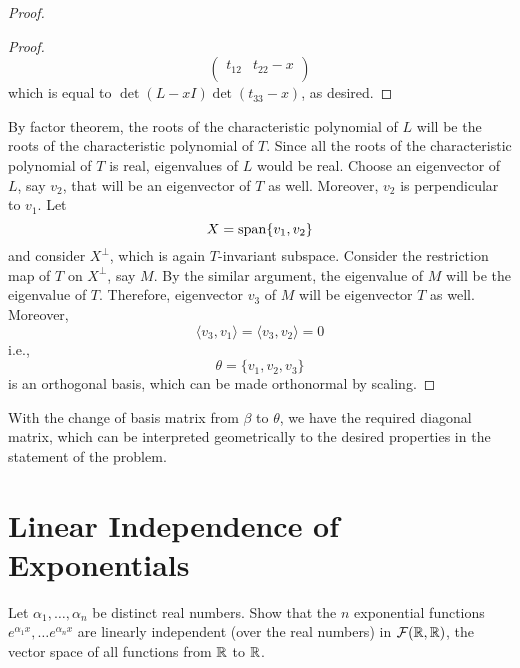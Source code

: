 \documentclass[11pt, a4paper, abstract=true]{scrartcl}
\begin{document}
\begin{soln}
\begin{proof}
\begin{proof}
\[\begin{pmatrix}
                t_{12} & t_{22} -x \\
            \end{pmatrix}
            \]
            which is equal to \(\det (L - xI) \det (t_{33} - x)\), as desired.
        \end{proof}
        By factor theorem, the roots of the characteristic polynomial of \(L\) will be the roots of the characteristic polynomial of \(T\). Since all the roots of the characteristic polynomial of \(T\) is real, eigenvalues of \(L\) would be real. Choose an eigenvector of \(L\), say \(v_2\), that will be an eigenvector of \(T\) as well. Moreover, \(v_2\) is perpendicular to \(v_1\). Let \[X = \operatorname{span}\{v_1, v_2\}\] and consider \(X^\perp\), which is again \(T\)-invariant subspace. Consider the restriction map of \(T\) on \(X^\perp\), say \(M\). By the similar argument, the eigenvalue of \(M\) will be the eigenvalue of \(T\). Therefore, eigenvector \(v_3\) of \(M\) will be eigenvector \(T\) as well. Moreover, \[\langle v_3, v_1 \rangle = \langle v_3, v_2 \rangle = 0\]
        i.e., \[\theta = \{v_1, v_2, v_3\}\] is an orthogonal basis, which can be made orthonormal by scaling.
    \end{proof}
    With the change of basis matrix from \(\beta\) to \(\theta\), we have the required diagonal matrix, which can be interpreted geometrically to the desired properties in the statement of the problem.
\end{soln}

\newpage

\section{Linear Independence of Exponentials}
\begin{problem*}
    Let \(\alpha_1, \dots, \alpha_n\) be distinct real numbers. Show that the \(n\) exponential functions \(e^{\alpha_1 x}, \dots e^{\alpha_n x}\) are linearly independent (over the real numbers) in \(\mathcal{F}(\mathbb R, \mathbb R)\), the vector space of all functions from \(\mathbb R\) to \(\mathbb R\).

\end{problem*}
\end{document}
